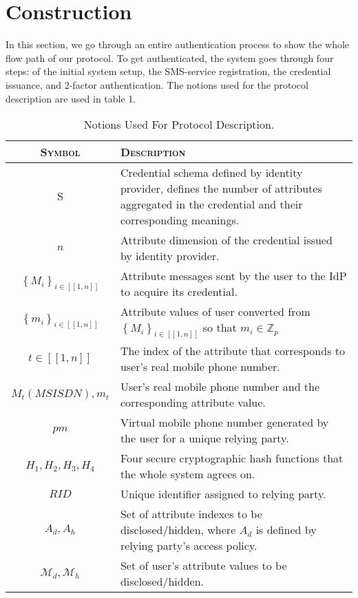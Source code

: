 \section{Construction}
In this section, we go through an entire authentication process to show the whole flow path of our protocol. To get authenticated, the system goes through four steps: of the initial system setup, the SMS-service registration, the credential issuance, and 2-factor authentication. The notions used for the protocol description are used in table 1.
\begin{table}[!ht]
\begin{center}
\caption{Notions Used For Protocol Description.}
\label{tab1}
\begin{tabular*}{\columnwidth}{|c|p{5.45cm}|}
\hline
\textsc{Symbol} & \centerline{\textsc{Description}}\\
\hline
$\mathrm{S}$ & Credential schema defined by identity provider, defines the number of attributes aggregated in the credential and their corresponding meanings.\\
$n$ & Attribute dimension of the credential issued by identity provider.\\
$\left\{M_{i}\right\}_{i \in[[1, n]]}$ &
Attribute messages sent by the user to the IdP to acquire its credential.
\\
$\left\{m_{i}\right\}_{i \in[[1, n]]}$ &
Attribute values of user converted from $\left\{M_{i}\right\}_{i \in[[1, n]]}$ so that $m_i \in \mathbb{Z}_p$
\\
$t\in [[1, n]]$& The index of the attribute that corresponds to user's real mobile phone number. \\
$M_t(MSISDN), m_t$ & User's real mobile phone number and the corresponding attribute value.\\
$pm$ & Virtual mobile phone number generated by the user for a unique 
relying party.\\
$H_1, H_2, H_3, H_4$ & Four secure cryptographic hash functions that the whole system agrees on.\\
$RID$ & Unique identifier assigned to relying party.\\
$A_d, A_h$ & Set of attribute indexes to be disclosed/hidden, where $A_d$ is defined by relying party's access policy.\\
$\mathcal{M}_d, \mathcal{M}_h$ & Set of user's attribute values to be disclosed/hidden. \\
\hline 
\end{tabular*}
\end{center}
\end{table}

